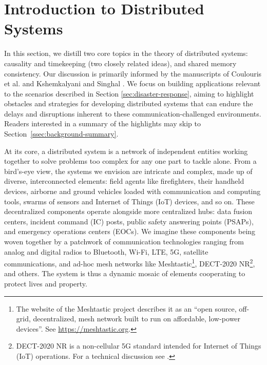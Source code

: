 \documentclass[]             %
{NASA}                       %
\theoremstyle{definition}
\begin{document}
\section{Introduction to Distributed Systems}\label{sec:background}
In this section, we distill two core topics in the theory of
distributed systems: causality and timekeeping (two closely related ideas), and shared
memory consistency.  Our discussion is primarily informed by the
manuscripts of Coulouris et al.  \cite{coulouris2005distributed} and
Kshemkalyani and Singhal \cite{kshemkalyani_singhal_2008}. We focus on
building applications relevant to the scenarios described in Section
\ref{sec:disaster-response}, aiming to highlight obstacles and
strategies for developing distributed systems that can endure the
delays and disruptions inherent to these communication-challenged
environments. Readers interested in a summary of the highlights may
skip to Section~\ref{ssec:background-summary}.

At its core, a distributed system is a network of independent entities
working together to solve problems too complex for any one part to
tackle alone. From a bird’s-eye view, the systems we envision are
intricate and complex, made up of diverse, interconnected elements:
field agents like firefighters, their handheld devices, airborne and
ground vehicles loaded with communication and computing tools, swarms
of sensors and Internet of Things (IoT) devices, and so on. These decentralized components
operate alongside more centralized hubs: data fusion centers, incident
command (IC) posts, public safety answering points (PSAPs), and
emergency operations centers (EOCs). We imagine these components being
woven together by a patchwork of communication technologies ranging
from analog and digital radios to Bluetooth, Wi-Fi, LTE, 5G, satellite
communications, and ad-hoc mesh networks like Meshtastic\footnote{The
  website of the Meshtastic project describes it as an ``open source,
  off-grid, decentralized, mesh network built to run on affordable,
  low-power devices''. See \url{https://meshtastic.org}.}, DECT-2020
NR\footnote{DECT-2020 NR is a non-cellular 5G
  standard intended for Internet of Things (IoT) operations. For a
  technical discussion see \cite{2022:dect-2020-nr}.}, and others. The
system is thus a dynamic mosaic of elements cooperating to protect
lives and property.
\end{document}
